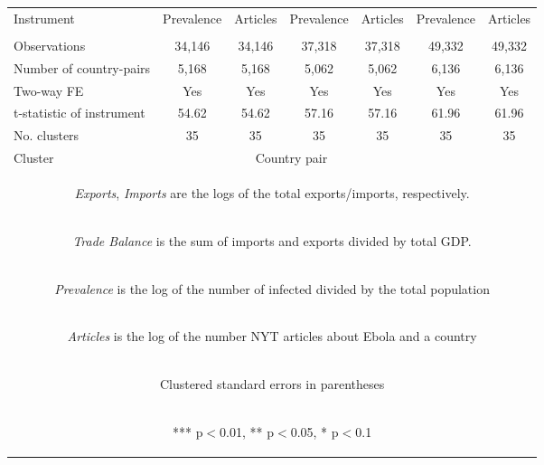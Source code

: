 \documentclass{article}
\begin{document}
\begin{table}[htbp]
{\begin{tabular}{lcccccc}
\vspace{4pt} Instrument & Prevalence & Articles & Prevalence & Articles & Prevalence & Articles \\ 
\vspace{4pt} & \begin{footnotesize}\end{footnotesize} & \begin{footnotesize}\end{footnotesize} & \begin{footnotesize}\end{footnotesize} & \begin{footnotesize}\end{footnotesize} \\ 
Observations & 34,146 & 34,146 & 37,318 & 37,318 & 49,332 & 49,332 \\
Number of country-pairs & 5,168 & 5,168 & 5,062 & 5,062 & 6,136 & 6,136 \\
Two-way FE & Yes & Yes & Yes & Yes & Yes & Yes \\
t-statistic of instrument & 54.62 & 54.62 & 57.16 & 57.16 & 61.96 & 61.96 \\
No. clusters & 35 & 35 & 35 & 35 & 35 & 35 \\ 
Cluster & &\multicolumn{2}{c}{Country pair} \\ \hline
\multicolumn{7}{c}{\begin{footnotesize} \textit{Exports}, \textit{Imports} are the logs of the total exports/imports, respectively.  \end{footnotesize} }\\
\multicolumn{7}{c}{\begin{footnotesize} \textit{Trade Balance} is the sum of imports and exports divided by total GDP. \end{footnotesize} }\\
\multicolumn{7}{c}{\begin{footnotesize} \textit{Prevalence} is the log of the number of infected divided by the total population \end{footnotesize} }\\
\multicolumn{7}{c}{\begin{footnotesize} \textit{Articles} is the log of the number NYT articles about Ebola and a country \end{footnotesize} }\\
\multicolumn{7}{c}{\begin{footnotesize} Clustered standard errors in parentheses\end{footnotesize}} \\
\multicolumn{7}{c}{\begin{footnotesize} *** p$<$0.01, ** p$<$0.05, * p$<$0.1\end{footnotesize}} \\
\end{tabular}
}
\end{table}
\end{document}
